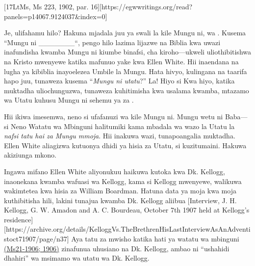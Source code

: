 [17LtMs, Ms 223, 1902, par. 16][https://egwwritings.org/read?panels=p14067.9124037&index=0]


Je, ulifahamu hilo? Hakuna mjadala juu ya swali la kile Mungu ni,  wa . Kusema “Mungu ni \_\_\_\_\_\_\_“, pengo hilo lazima lijazwe na  Biblia kwa uwazi inafundisha kwamba Mungu ni kiumbe binafsi, cha kiroho—ukweli uliothibitishwa na Kristo mwenyewe katika mafunuo yake kwa Ellen White. Hii inaendana na lugha ya kibiblia inayoelezea Umbile la Mungu. Hata hivyo, kulingana na taarifa hapo juu, tunaweza kusema “\textit{Mungu ni utatu}?” La! Hiyo si  Kwa hiyo, katika muktadha uliochunguzwa, tunaweza kuhitimisha kwa usalama kwamba, mtazamo wa Utatu kuhusu Mungu ni sehemu ya  za .


Hii ikiwa imesemwa, neno  si ufafanuzi wa kile Mungu ni. Mungu wetu ni Baba—si  Neno Watatu wa Mbinguni halitumiki kama mbadala wa wazo la Utatu la \textit{nafsi tatu hai za Mungu mmoja}. Hii inakuwa wazi, tunapoangalia muktadha. Ellen White aliagizwa kutuonya dhidi ya hisia za Utatu, si kuzitumaini. Hakuwa akiziunga mkono.


Ingawa mifano Ellen White aliyonukuu haikuwa kutoka kwa Dk. Kellogg, inaonekana kwamba wafuasi wa Kellogg, kama si Kellogg mwenyewe, walikuwa wakimtetea kwa hisia za William Boardman. Hatuna data ya moja kwa moja kuthibitisha hili, lakini tunajua kwamba Dk. Kellogg aliibua [Interview, J. H. Kellogg, G. W. Amadon and A. C. Bourdeau, October 7th 1907 held at Kellogg's residence][https://archive.org/details/KelloggVs.TheBrethrenHisLastInterviewAsAnAdventistoct71907/page/n37] Aya tatu za mwisho katika hati ya watatu wa mbinguni \href{https://egwwritings.org/?ref=en_Ms21-1906&para=9754.1}{(Ms21-1906; 1906)} zinafunua uhusiano na Dk. Kellogg, ambao ni “ushahidi dhahiri” wa msimamo wa utatu wa Dk. Kellogg.


